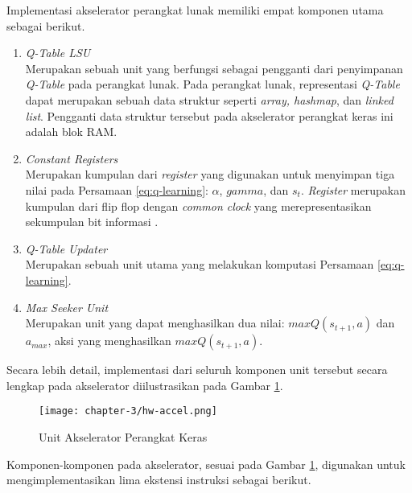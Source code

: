 Implementasi akselerator perangkat lunak memiliki empat komponen utama sebagai berikut.

\begin{enumerate}
	\item \textit{Q-Table \ac{LSU}}\\
	      Merupakan sebuah unit yang berfungsi sebagai pengganti dari penyimpanan \textit{Q-Table} pada perangkat lunak. Pada perangkat lunak, representasi \textit{Q-Table} dapat merupakan sebuah data struktur seperti \textit{array, hashmap}, dan \textit{linked list}. Pengganti data struktur tersebut pada akselerator perangkat keras ini adalah blok \ac{RAM}.
	\item \textit{Constant Registers}\\
	      Merupakan kumpulan dari \textit{register} yang digunakan untuk menyimpan tiga nilai pada Persamaan \ref{eq:q-learning}: $\alpha$, $gamma$, dan $s_t$. \textit{Register} merupakan kumpulan dari flip flop dengan \textit{common clock} yang merepresentasikan sekumpulan bit informasi \parencite{sarah2021digital}.
	\item \textit{Q-Table Updater}\\
	      Merupakan sebuah unit utama yang melakukan komputasi Persamaan \ref{eq:q-learning}.
	\item \textit{Max Seeker Unit}\\
	      Merupakan unit yang dapat menghasilkan dua nilai: $maxQ(s_{t+1},a)$ dan $a_{max}$, aksi yang menghasilkan $maxQ(s_{t+1},a)$.
\end{enumerate}


Secara lebih detail, implementasi dari seluruh komponen unit tersebut secara lengkap pada akselerator diilustrasikan pada Gambar \ref{fig:hw-accel}.

\begin{figure}[H]
	\centering
	\texttt{[image: chapter-3/hw-accel.png]}
	\caption{Unit Akselerator Perangkat Keras}
	\label{fig:hw-accel}
\end{figure}

Komponen-komponen pada akselerator, sesuai pada Gambar \ref{fig:hw-accel}, digunakan untuk mengimplementasikan lima ekstensi instruksi sebagai berikut.

